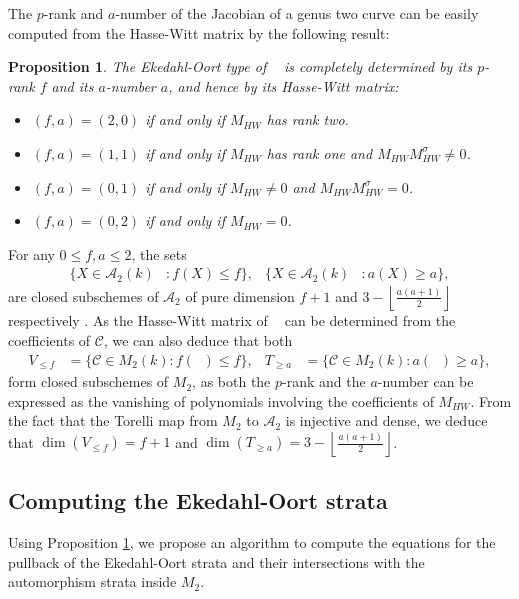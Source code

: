 \documentclass{amsart}
\newcommand{\calA}{\mathcal{A}}
\newcommand{\calC}{\mathcal{C}}
\DeclareMathOperator{\Jac}{Jac}
\DeclareMathOperator{\Jacc}{\Jac(\mathcal{C})}
\newcommand{\floor}[1]{\left\lfloor #1 \right\rfloor}
\numberwithin{equation}{section}
\newtheorem{proposition}[theorem]{Proposition}
\theoremstyle{definition}
\theoremstyle{remark}
\begin{document}
The $p$-rank and $a$-number of the Jacobian of a genus two curve can be easily computed from the Hasse-Witt matrix by the following result:
\begin{proposition} \label{HW_prop} \cite[Lemma 1.1]{Ibukiyama1986SupersingularNumbers}
The Ekedahl-Oort type of $\Jacc$ is completely determined by its $p$-rank $f$ and its $a$-number $a$, and hence by its Hasse-Witt matrix:
\begin{itemize}
    \item $(f,a)=(2,0)$ if and only if $M_{HW}$ has rank two.
    \item $(f,a)=(1,1)$ if and only if $M_{HW}$ has rank one and $M_{HW}M_{HW}^\sigma\neq 0$.
    \item $(f,a)=(0,1)$ if and only if $M_{HW}\neq 0$ and $M_{HW}M_{HW}^\sigma= 0$.
    \item $(f,a)=(0,2)$ if and only if $M_{HW}= 0$.\\
\end{itemize}
\end{proposition}
For any $0 \leq f,a \leq 2$, the sets
\begin{align*}
\{X \in \calA_2(k) &: f(X) \leq f\}, & \{X \in \calA_2(k) &: a(X) \geq a\},
\end{align*}
are closed subschemes of $\calA_2$ of pure dimension $f+1$ and $3-\floor{\tfrac{a(a+1)}{2}}$ respectively \cite[Theorem 14.7]{vanderGeer1999CyclesVarieties}. As the Hasse-Witt matrix of $\Jacc$ can be determined from the coefficients of $\calC$, we can also deduce that both
\begin{align*}
V_{\leq f}&=\{\calC \in M_2(k) : f(\Jacc) \leq f\}, &
T_{\geq a}&=\{\calC \in M_2(k) : a(\Jacc) \geq a\},
\end{align*}
form closed subschemes of $M_2$, as both the $p$-rank and the $a$-number can be expressed as the vanishing of polynomials involving the coefficients of $M_{HW}$. From the fact that the Torelli map from $M_2$ to $\calA_2$ is injective and dense, we deduce that $\dim(V_{\leq f})=f+1$ and $\dim(T_{\geq a})=3-\floor{\tfrac{a(a+1)}{2}}$.\\

\subsection{Computing the Ekedahl-Oort strata}
Using Proposition \ref{HW_prop}, we propose an algorithm to compute the equations for the pullback of the Ekedahl-Oort strata and their intersections with the automorphism strata inside $M_2$.\\
\end{document}
